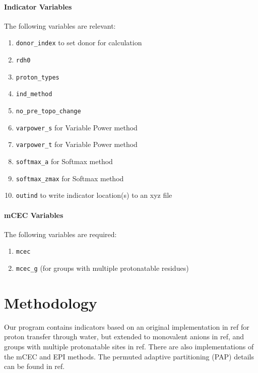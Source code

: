 \documentclass{article}
\begin{document}
\paragraph{Indicator Variables}
The following variables are relevant:
\begin{enumerate}
	\item \texttt{donor\_index} to set donor for calculation
	\item \texttt{rdh0}
	\item \texttt{proton\_types}
	\item \texttt{ind\_method}
	\item \texttt{no\_pre\_topo\_change}
	\item \texttt{varpower\_s} for Variable Power method
	\item \texttt{varpower\_t} for Variable Power method
	\item \texttt{softmax\_a} for Softmax method
	\item \texttt{softmax\_zmax} for Softmax method
	\item \texttt{outind} to write indicator location(s) to an xyz file
\end{enumerate}

\paragraph{mCEC Variables}
The following variables are required:
\begin{enumerate}
	\item \texttt{mcec}
	\item \texttt{mcec\_g} (for groups with multiple protonatable residues)
\end{enumerate}

\section{Methodology}
Our program contains indicators based on an original implementation in ref\cite{Wu2013} for proton transfer through water, but extended to monovalent anions in ref\cite{Garza2019}, and groups with multiple protonatable sites in ref.\cite{Duster2019}
There are also implementations of the mCEC\cite{Konig2006} and EPI\cite{Watanabe2020} methods.
The permuted adaptive partitioning (PAP) details can be found in ref.\cite{Pezeshki2015}
\end{document}
